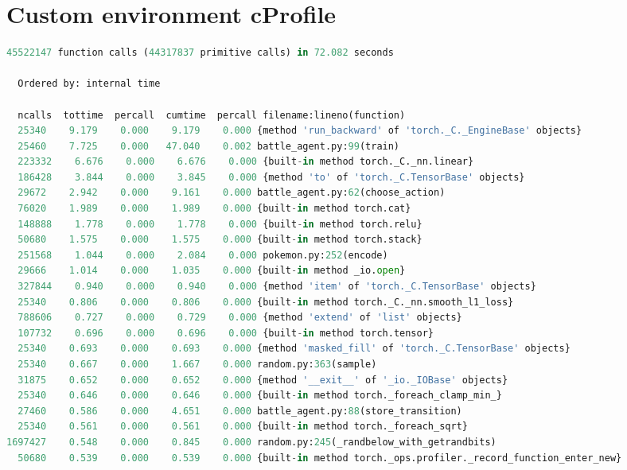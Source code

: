 \section{Custom environment cProfile}
\label{appendix:custom-env-cprofile}

\begin{changemargin}{-2cm}{-2cm}

\begin{lstlisting}[basicstyle=\fontsize{8}{8}\selectfont\ttfamily,language=Python,caption={Excerpt of custom environment implementation cProfile sorted by time.}]
        45522147 function calls (44317837 primitive calls) in 72.082 seconds

  Ordered by: internal time

  ncalls  tottime  percall  cumtime  percall filename:lineno(function)
  25340    9.179    0.000    9.179    0.000 {method 'run_backward' of 'torch._C._EngineBase' objects}
  25460    7.725    0.000   47.040    0.002 battle_agent.py:99(train)
  223332    6.676    0.000    6.676    0.000 {built-in method torch._C._nn.linear}
  186428    3.844    0.000    3.845    0.000 {method 'to' of 'torch._C.TensorBase' objects}
  29672    2.942    0.000    9.161    0.000 battle_agent.py:62(choose_action)
  76020    1.989    0.000    1.989    0.000 {built-in method torch.cat}
  148888    1.778    0.000    1.778    0.000 {built-in method torch.relu}
  50680    1.575    0.000    1.575    0.000 {built-in method torch.stack}
  251568    1.044    0.000    2.084    0.000 pokemon.py:252(encode)
  29666    1.014    0.000    1.035    0.000 {built-in method _io.open}
  327844    0.940    0.000    0.940    0.000 {method 'item' of 'torch._C.TensorBase' objects}
  25340    0.806    0.000    0.806    0.000 {built-in method torch._C._nn.smooth_l1_loss}
  788606    0.727    0.000    0.729    0.000 {method 'extend' of 'list' objects}
  107732    0.696    0.000    0.696    0.000 {built-in method torch.tensor}
  25340    0.693    0.000    0.693    0.000 {method 'masked_fill' of 'torch._C.TensorBase' objects}
  25340    0.667    0.000    1.667    0.000 random.py:363(sample)
  31875    0.652    0.000    0.652    0.000 {method '__exit__' of '_io._IOBase' objects}
  25340    0.646    0.000    0.646    0.000 {built-in method torch._foreach_clamp_min_}
  27460    0.586    0.000    4.651    0.000 battle_agent.py:88(store_transition)
  25340    0.561    0.000    0.561    0.000 {built-in method torch._foreach_sqrt}
1697427    0.548    0.000    0.845    0.000 random.py:245(_randbelow_with_getrandbits)
  50680    0.539    0.000    0.539    0.000 {built-in method torch._ops.profiler._record_function_enter_new}

\end{lstlisting}
\end{changemargin}
